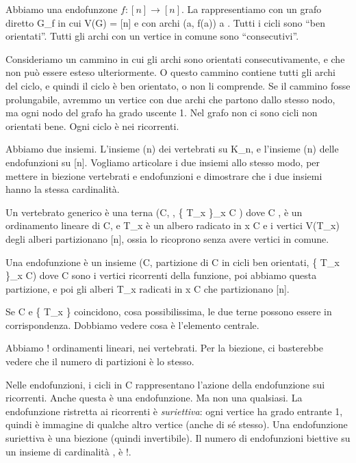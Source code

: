 
Abbiamo una endofunzone $f : [n] \to [n]$.
La rappresentiamo con un grafo diretto G_f in cui V(G) = [n] e con archi (a, f(a)) \forall a \in [n].
Tutti i cicli sono ``ben orientati''.
Tutti gli archi con un vertice in comune sono ``consecutivi''.

Consideriamo un cammino in cui gli archi sono orientati consecutivamente, e che non pu\`o essere esteso ulteriormente.
O questo cammino contiene tutti gli archi del ciclo, e quindi il ciclo \`e ben orientato, o non li comprende.
Se il cammino fosse prolungabile, avremmo un vertice con due archi che partono dallo stesso nodo, ma ogni nodo del grafo ha grado uscente 1.
Nel grafo non ci sono cicli non orientati bene.
Ogni ciclo \`e nei ricorrenti.

Abbiamo due insiemi.
L'insieme (n) dei vertebrati su K_n, e l'insieme (n) delle endofunzioni su [n].
Vogliamo articolare i due insiemi allo stesso modo, per mettere in biezione vertebrati e endofunzioni e dimostrare che i due insiemi hanno 
la stessa cardinalit\`a.

Un vertebrato generico \`e una terna (C, , \{ T_x \}_{x \in C} ) dove C \subseteq [n],  \`e un ordinamento lineare di C, e T_x \`e un albero radicato in x \in C e i vertici V(T_x) degli alberi partizionano [n], ossia lo ricoprono senza avere vertici in comune.

Una endofunzione \`e un insieme (C, partizione di C in cicli ben orientati, \{ T_x \}_{x \in C}) dove C \subseteq [n] sono i vertici ricorrenti della funzione, poi abbiamo questa partizione, e poi gli alberi T_x radicati in x \in C che partizionano [n].

Se C e \{ T_x \} coincidono, cosa possibilissima, le due terne possono essere in corrispondenza.
Dobbiamo vedere cosa \`e l'elemento centrale.

Abbiamo ! ordinamenti lineari, nei vertebrati.
Per la biezione, ci basterebbe vedere che il numero di partizioni \`e lo stesso.

Nelle endofunzioni, i cicli in C rappresentano l'azione della endofunzione sui ricorrenti.
Anche questa \`e una endofunzione.
Ma non una qualsiasi.
La endofunzione ristretta ai ricorrenti \`e \emph{suriettiva}: ogni vertice ha grado entrante 1, quindi \`e immagine di qualche altro vertice (anche di s\'e stesso).
Una endofunzione suriettiva \`e una biezione (quindi invertibile).
Il numero di endofunzioni biettive su un insieme di cardinalit\`a , \`e !.

